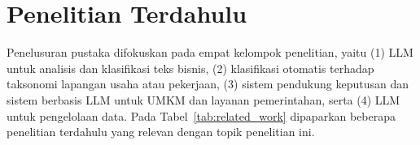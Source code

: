 \section{Penelitian Terdahulu}
\label{sec:terkait}

Penelusuran pustaka difokuskan pada empat kelompok penelitian, yaitu (1) LLM untuk analisis dan klasifikasi teks bisnis, (2) klasifikasi otomatis terhadap taksonomi lapangan usaha atau pekerjaan, (3) sistem pendukung keputusan dan sistem berbasis LLM untuk UMKM dan layanan pemerintahan, serta (4) LLM untuk pengelolaan data. Pada Tabel~\ref{tab:related_work} dipaparkan beberapa penelitian terdahulu yang relevan dengan topik penelitian ini.

\clearpage
\begingroup
\setlength{\pdfpagewidth}{297mm}\setlength{\pdfpageheight}{210mm}
\setlength{\paperwidth}{297mm}\setlength{\paperheight}{210mm}
\setlength{\textwidth}{227mm}\setlength{\textheight}{140mm}
\setlength{\columnwidth}{\textwidth}\setlength{\linewidth}{\textwidth}\setlength{\hsize}{\textwidth}
\setlength{\headwidth}{\textwidth}
\pagestyle{tabellanskap}
\makeatletter\global\@colht\textheight\global\@colroom\textheight\global\vsize\textheight\makeatother
